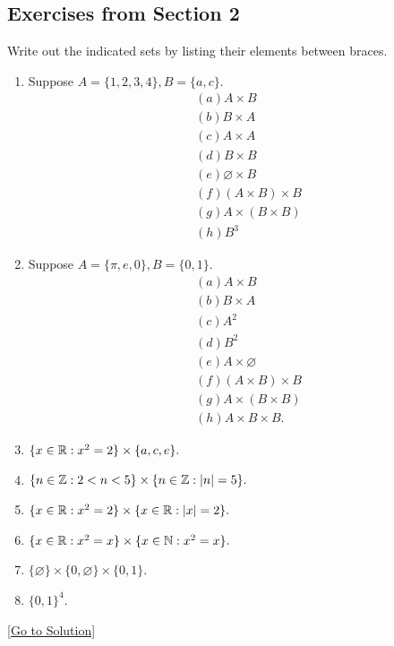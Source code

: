 \subsection{Exercises from Section 2}
\begin{exercise}\label{ex:2.1}
    Write out the indicated sets by listing their elements between braces. 
    \begin{enumerate}
        \item Suppose $A=\{ 1,2,3,4 \},B=\{ a,c \}$. 
        $$
        \begin{aligned}
            &(a) A\times B \\
            &(b) B\times A\\
            &(c) A\times A \\
            &(d) B\times B\\
            &(e) \varnothing \times B \\
            &(f) (A\times B)\times B\\
            &(g) A\times (B\times B)\\
            &(h) B^3
        \end{aligned}
        $$
        \item Suppose $A=\{ \pi,e,0 \},B=\{ 0,1 \}$.
        $$
        \begin{aligned}
            &(a) A\times B \\
            &(b) B\times A \\
            &(c) A^2 \\
            &(d) B^2\\
            &(e) A\times\varnothing \\
            &(f) (A\times B)\times B \\
            &(g) A\times(B\times B) \\
            &(h) A\times B\times B.
        \end{aligned}
        $$
        \item 
        $
        \{ x\in\mathbb{R}: x^2=2 \}\times \{ a,c,e \}.
        $
        \item 
        $
        \{ n\in\mathbb{Z}:2<n<5 \}\times \{ n\in\mathbb{Z}:\lvert n \rvert=5 \}.
        $
        \item 
        $
        \{ x\in\mathbb{R}:x^2=2 \}\times \{ x\in\mathbb{R}:\lvert x \rvert=2 \}.
        $
        \item 
        $
        \{ x\in\mathbb{R}:x^2=x \}\times \{ x\in\mathbb{N}:x^2=x \}. 
        $
        \item 
        $
        \{ \varnothing \}\times \{ 0,\varnothing \}\times \{ 0,1 \}.
        $
        \item $\{ 0,1 \}^{4}$.
    \end{enumerate}
\end{exercise}\hyperref[sol:2.1]{[Go to Solution]}

